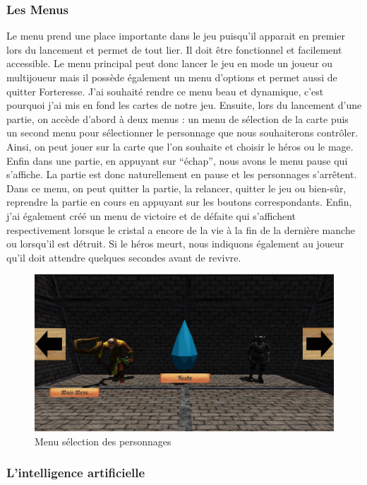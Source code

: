 \documentclass[a4paper, 12pt]{article}
\begin{document}
		\subsubsection{Les Menus}

Le menu prend une place importante dans le jeu puisqu’il apparait en premier lors du lancement et permet de tout lier. Il doit être fonctionnel et facilement accessible. Le menu principal peut donc lancer le jeu en mode un joueur ou multijoueur mais il possède également un menu d’options et permet aussi de quitter Forteresse. J’ai souhaité rendre ce menu beau et dynamique, c’est pourquoi j’ai mis en fond les cartes de notre jeu. Ensuite, lors du lancement d’une partie, on accède d’abord à deux menus : un menu de sélection de la carte puis un second menu pour sélectionner le personnage que nous souhaiterons contrôler. Ainsi, on peut jouer sur la carte que l’on souhaite et choisir le héros ou le mage. Enfin dans une partie, en appuyant sur “échap”, nous avons le menu pause qui s’affiche. La partie est donc naturellement en pause et les personnages s’arrêtent. Dans ce menu, on peut quitter la partie, la relancer, quitter le jeu ou bien-s\^ur, reprendre la partie en cours en appuyant sur les boutons correspondants. Enfin, j’ai également créé un menu de victoire et de d\'efaite qui s’affichent respectivement lorsque le cristal a encore de la vie à la fin de la dernière manche ou lorsqu’il est détruit. Si le héros meurt, nous indiquons également au joueur qu’il doit attendre quelques secondes avant de revivre.
\begin{figure}[!ht]
\centerline{\includegraphics[scale=0.3]{selectionDesPersonnages.png}}
\caption*{Menu s\'election des personnages}
\end{figure}

		\subsubsection{L'intelligence artificielle}
\end{document}

